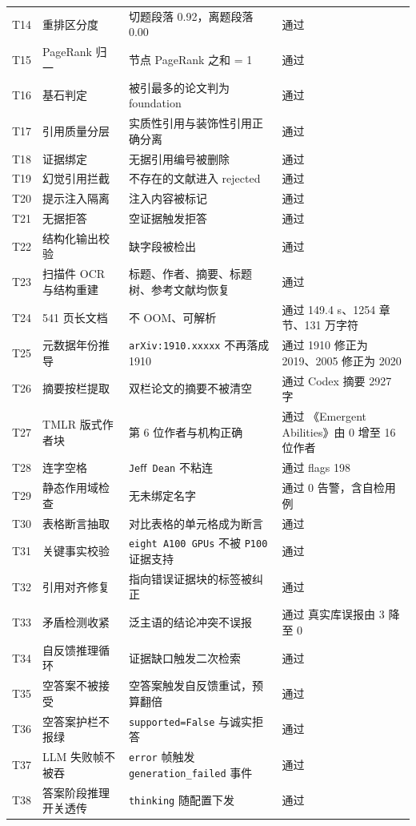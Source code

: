 \documentclass[UTF8,fontset=windows,zihao=5,a4paper]{ctexart}
\begin{document}
\begin{longtable}{@{}p{}p{}p{}p{}@{}}
T14 & 重排区分度 & 切题段落 0.92，离题段落 0.00 & 通过 \\
T15 & PageRank 归一 & 节点 PageRank 之和 = 1 & 通过 \\
T16 & 基石判定 & 被引最多的论文判为 foundation & 通过 \\
T17 & 引用质量分层 & 实质性引用与装饰性引用正确分离 & 通过 \\
T18 & 证据绑定 & 无据引用编号被删除 & 通过 \\
T19 & 幻觉引用拦截 & 不存在的文献进入 rejected & 通过 \\
T20 & 提示注入隔离 & 注入内容被标记 & 通过 \\
T21 & 无据拒答 & 空证据触发拒答 & 通过 \\
T22 & 结构化输出校验 & 缺字段被检出 & 通过 \\
T23 & 扫描件 OCR 与结构重建 & 标题、作者、摘要、标题树、参考文献均恢复 & 通过 \\
T24 & 541 页长文档 & 不 OOM、可解析 & 通过 149.4 s、1254 章节、131 万字符 \\
T25 & 元数据年份推导 & \texttt{arXiv:1910.xxxxx} 不再落成 1910 & 通过 1910 修正为 2019、2005 修正为 2020 \\
T26 & 摘要按栏提取 & 双栏论文的摘要不被清空 & 通过 Codex 摘要 2927 字 \\
T27 & TMLR 版式作者块 & 第 6 位作者与机构正确 & 通过 《Emergent Abilities》由 0 增至 16 位作者 \\
T28 & 连字空格 & \texttt{Jeﬀ Dean} 不粘连 & 通过 flags 198 \\
T29 & 静态作用域检查 & 无未绑定名字 & 通过 0 告警，含自检用例 \\
T30 & 表格断言抽取 & 对比表格的单元格成为断言 & 通过 \\
T31 & 关键事实校验 & \texttt{eight A100 GPUs} 不被 \texttt{P100} 证据支持 & 通过 \\
T32 & 引用对齐修复 & 指向错误证据块的标签被纠正 & 通过 \\
T33 & 矛盾检测收紧 & 泛主语的结论冲突不误报 & 通过 真实库误报由 3 降至 0 \\
T34 & 自反馈推理循环 & 证据缺口触发二次检索 & 通过 \\
T35 & 空答案不被接受 & 空答案触发自反馈重试，预算翻倍 & 通过 \\
T36 & 空答案护栏不报绿 & \texttt{supported=False} 与诚实拒答 & 通过 \\
T37 & LLM 失败帧不被吞 & \texttt{error} 帧触发 \texttt{generation\_\allowbreak{}failed} 事件 & 通过 \\
T38 & 答案阶段推理开关透传 & \texttt{thinking} 随配置下发 & 通过 \\

\end{longtable}
\end{document}
